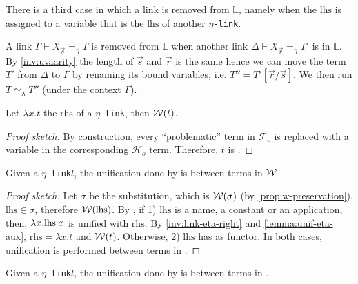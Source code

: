 \documentclass[sigconf,natbib=false,review]{acmart}
\newcommand{\appsep}{\ensuremath{\textcolor{lightgray}{\cdot}}}
\newcommand{\UnifRel}{\ensuremath{\simeq}}
\newcommand{\Ue}{\ensuremath{\UnifRel_\lambda}\xspace}
\newcommand{\linkMacro}[1]{\ensuremath{#1}\texttt{-link}\xspace}
\newcommand{\linketa} {\linkMacro{\eta}}
\newcommand{\Fo}{\ensuremath{\mathcal{F}_{\!o}\xspace}} %
\newcommand{\Ho}{\ensuremath{\mathcal{H}_o}\xspace}
\newcommand{\linketaM}[3]{\ensuremath{#1 \vdash #2 =_\eta #3}}
\newcommand{\lhs}{\ensuremath{\mathrm{lhs}}\xspace}
\newcommand{\rhs}{\ensuremath{\mathrm{rhs}}\xspace}
\newcommand{\linkStore}{\ensuremath{\mathbb{L}}\xspace}
\begin{document}
There is a third case in which a link is removed from \linkStore, namely
when the \lhs is assigned to a variable that is the \lhs of another
\linketa.

\newcommand{\progressetadedup}{\emph{progress-$\eta$-deduplicate}\xspace}
\begin{definition}[\progressetadedup]\label{def:progressetadedup}
  A link \linketaM{\Gamma}{X_{\vec{s}}}{T} is removed from \linkStore when
  another link \linketaM{\Delta}{X_{\vec{r}}}{T'} is in  \linkStore.
  By \cref{inv:uvaarity} the length of $\vec{s}$ and $\vec{r}$ is the same
  hence we can move the term $T'$ from $\Delta$ to $\Gamma$ by renaming its
  bound variables, i.e. $T'' = T'[\vec{r}/\vec{s}]$.
  We then run $T \Ue{} T''$ (under the context $\Gamma$).
\end{definition}

\begin{lemma}
  Let $\lambda x.t$ the \rhs of a \linketa, then $\mathcal{W}(t)$.
  \label{lemma:unif-eta-aux}
\end{lemma}

\begin{proof}[Proof sketch]
  By construction, every ``problematic'' term in \Fo{} is replaced with a variable
  in the corresponding \Ho term. Therefore, $t$ is \wellb.
\end{proof}

\begin{lemma}
  Given a \linketa $l$, the unification done by \progressetaleft is between
  terms in $\mathcal{W}$  
  \label{lemma:unif-eta-1}
\end{lemma}

\begin{proof}[Proof sketch]
  Let $\sigma$ be the substitution, which is  $\mathcal{W}(\sigma)$ (by
  \cref{prop:w-preservation}). $\lhs \in \sigma$, therefore $\wellb(\lhs)$. By
  \progressetaleft, if 1) \lhs is a name, a constant or an
  application, then, $\lambda x.\lhs \appsep x$ is unified with \rhs. By
  \cref{inv:link-eta-right} and \cref{lemma:unif-eta-aux}, $\rhs = \lambda x. t$ and $\mathcal{W}(t)$.
  Otherwise, 2) \lhs has  as functor. In both cases, unification is
  performed between terms in \wellb.
\end{proof}

\begin{lemma}
  Given a \linketa $l$, the unification done by \progressetaright is between
  terms in \wellb.
  \label{lemma:unif-eta-2}
\end{lemma}
\end{document}
